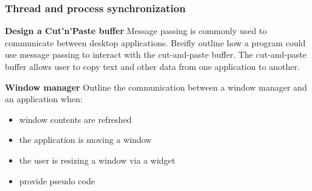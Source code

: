 
\subsubsection*{Thread and process synchronization}
\textbf{Design a Cut'n'Paste buffer}
Message passing is commonly used to communicate between desktop applications. Breifly outline how a program could use message passing to interact with the cut-and-paste buffer. The cut-and-paste buffer allows user to copy text and other data from one application to another.

\textbf{Window manager}
Outline the communication between a window manager and an application when:
\begin{itemize}
	\item window contents are refreshed
	\item the application is moving a window
	\item the user is resizing a window via a widget
	\item provide pseudo code
\end{itemize}

